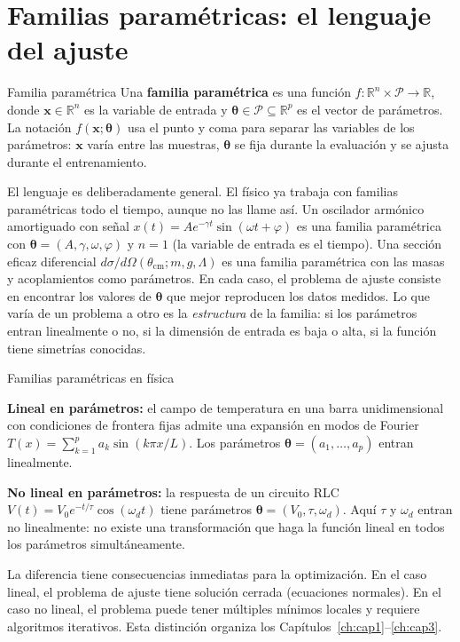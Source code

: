 \section{Familias paramétricas: el lenguaje del ajuste}
\label{sec:familias}


\begin{definicion}{Familia paramétrica}
\label{def:familia}
Una \textbf{familia paramétrica} es una función
$f: \mathbb{R}^n \times \mathcal{P} \to \mathbb{R}$, donde $\bm{x} \in
\mathbb{R}^n$ es la variable de entrada y $\bm{\theta} \in \mathcal{P}
\subseteq \mathbb{R}^p$ es el vector de parámetros. La notación
$f(\bm{x};\bm{\theta})$ usa el punto y coma para separar las variables
de los parámetros: $\bm{x}$ varía entre las muestras, $\bm{\theta}$ se
fija durante la evaluación y se ajusta durante el entrenamiento.
\end{definicion}

El lenguaje es deliberadamente general. El físico ya trabaja con familias
paramétricas todo el tiempo, aunque no las llame así. Un oscilador armónico
amortiguado con señal $x(t) = Ae^{-\gamma t}\sin(\omega t + \varphi)$ es
una familia paramétrica con $\bm{\theta} = (A, \gamma, \omega, \varphi)$
y $n = 1$ (la variable de entrada es el tiempo). Una sección eficaz
diferencial $d\sigma/d\Omega(\theta_{\text{cm}}; m, g, \Lambda)$ es una
familia paramétrica con las masas y acoplamientos como parámetros. En
cada caso, el problema de ajuste consiste en encontrar los valores de
$\bm{\theta}$ que mejor reproducen los datos medidos. Lo que varía de un
problema a otro es la \emph{estructura} de la familia: si los parámetros
entran linealmente o no, si la dimensión de entrada es baja o alta, si la
función tiene simetrías conocidas.

\begin{ejemplo}{Familias paramétricas en física}
\label{ej:familias_fisica}

\textbf{Lineal en parámetros:} el campo de temperatura en una barra
unidimensional con condiciones de frontera fijas admite una expansión en
modos de Fourier $T(x) = \sum_{k=1}^p a_k \sin(k\pi x/L)$. Los
parámetros $\bm{\theta} = (a_1, \ldots, a_p)$ entran linealmente.

\textbf{No lineal en parámetros:} la respuesta de un circuito RLC
$V(t) = V_0 e^{-t/\tau}\cos(\omega_d t)$ tiene parámetros
$\bm{\theta} = (V_0, \tau, \omega_d)$. Aquí $\tau$ y $\omega_d$ entran
no linealmente: no existe una transformación que haga la función lineal
en todos los parámetros simultáneamente.

La diferencia tiene consecuencias inmediatas para la optimización. En el
caso lineal, el problema de ajuste tiene solución cerrada (ecuaciones
normales). En el caso no lineal, el problema puede tener múltiples mínimos
locales y requiere algoritmos iterativos. Esta distinción organiza los
Capítulos~\ref{ch:cap1}--\ref{ch:cap3}.
\end{ejemplo}

